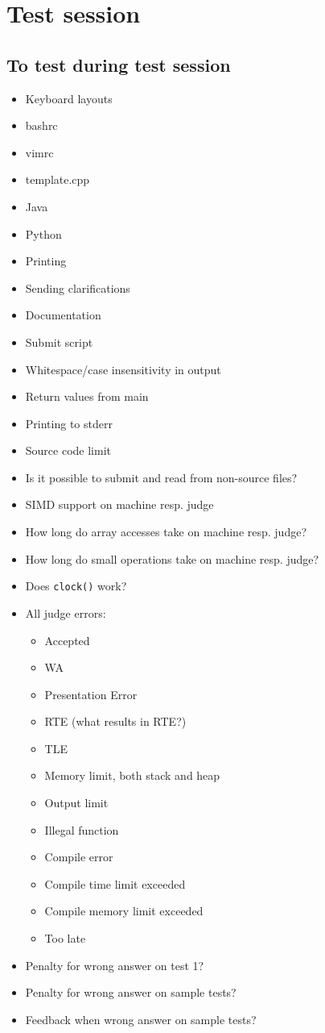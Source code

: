 \appendix
\chapter{Test session}

\section{To test during test session}
\begin{itemize}
	\item Keyboard layouts
	\item bashrc
	\item vimrc
	\item template.cpp
	\item Java
	\item Python
	\item Printing
	\item Sending clarifications
	\item Documentation
	\item Submit script
	\item Whitespace/case insensitivity in output
	\item Return values from main
	\item Printing to stderr
	\item Source code limit
	\item Is it possible to submit and read from non-source files?
	\item SIMD support on machine resp. judge
	\item How long do array accesses take on machine resp. judge?
	\item How long do small operations take on machine resp. judge?
	\item Does \texttt{clock()} work?
	\item All judge errors:
		\begin{itemize}
			\item Accepted
			\item WA
			\item Presentation Error
			\item RTE (what results in RTE?)
			\item TLE
			\item Memory limit, both stack and heap
			\item Output limit
			\item Illegal function
			\item Compile error
			\item Compile time limit exceeded
			\item Compile memory limit exceeded
			\item Too late
		\end{itemize}
	\item Penalty for wrong answer on test 1?
	\item Penalty for wrong answer on sample tests?
	\item Feedback when wrong answer on sample tests?
\end{itemize}
